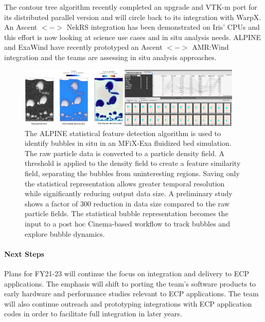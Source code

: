 The contour tree algorithm recently completed an upgrade and VTK-m port for its distributed parallel version and will circle back to its integration with WarpX.   An Ascent $<->$ NekRS  integration has been demonstrated on Iris' CPUs and this effort is now looking at science use cases and in situ analysis needs.   ALPINE and ExaWind have recently prototyped an Ascent $<->$ AMR:Wind integration and the teams are assessing in situ analysis approaches.  

\begin{figure}[htb]
	\begin{center}
		\includegraphics[width=0.95\textwidth]{projects/2.3.4-DataViz/2.3.4.16-ALPINE-ZFP/alpine-cinema-mfixexa-workflow.png}
		\caption{The ALPINE statistical feature detection algorithm is used to identify bubbles in situ in an MFiX-Exa fluidized bed simulation.  The raw particle data is converted to a particle density field.  A threshold is applied to the density field to create a feature similarity field, separating the bubbles from uninteresting regions.  Saving only the statistical representation allows greater temporal resolution while significantly reducing output data size.  A preliminary study shows a factor of 300 reduction in data size compared to the raw particle fields. The statistical bubble representation becomes the input to a post hoc Cinema-based workflow to track bubbles and explore bubble dynamics. }
		\label{fig:alpine-statistical-feature}
	\end{center}
\end{figure}

\paragraph{Next Steps}

Plans for FY21-23 will continue the focus on integration and delivery to ECP applications. The emphasis will shift to porting the team’s software products to early hardware and performance studies relevant to ECP applications. The team will also continue outreach and prototyping integrations with ECP application codes in order to facilitate full integration in later years.

